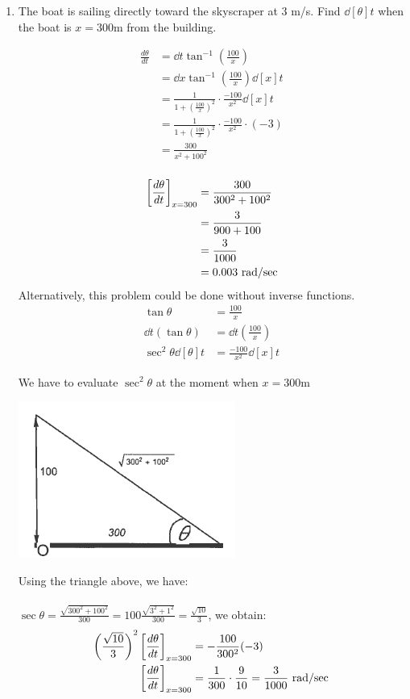 \documentclass[nooutcomes,handout]{ximera}
\begin{document}
\begin{problem}
\begin{enumerate}
	\item The boat is sailing directly toward the skyscraper at $3$ m/s.  Find $\dd[\theta]{t}$ when the boat is $x=300$m from the building.
	\begin{freeResponse}
	\begin{align*}
	\frac{d\theta}{dt}&=\dd{t}\tan^{-1}\left( \frac{100}{x} \right)\\
	&=\dd{x}\tan^{-1}\left( \frac{100}{x} \right)\dd[x]{t}\\
	&=\frac{1}{1+\left(\frac{100}{x}\right)^2} \cdot \frac{-100}{x^2} \dd[x]{t}\\
	&=\frac{1}{1+\left(\frac{100}{x}\right)^2} \cdot \frac{-100}{x^2} \cdot (-3)\\
	&=\frac{300}{x^2+100^2}\\\\
	\end{align*}
	\begin{align*}	
	\eval{\dd[\theta]{t}}_{x=300}&=\frac{300}{300^2+100^2}\\
	&=\frac{3}{900+100}\\
	&=\frac{3}{1000}\\
	&=0.003\ \text{rad/sec}
		\end{align*}
		Alternatively, this problem could be done without inverse functions.\\
	\begin{align*}
	\tan\theta&=\frac{100}{x}\\
	\dd{t}(\tan\theta)&=\dd{t} \left(\frac{100}{x}\right)\\
	\sec^2\theta \dd[\theta]{t}&=\frac{-100}{x^2}\dd[x]{t}
	\end{align*}
	
	We have to evaluate $\sec^2\theta$ at the moment when $x=300$m\\
	    \begin{image}
      \includegraphics[scale = 0.7]{figure7.png}
    \end{image}
	Using the triangle above, we have:\\\\
	$\sec\theta=\frac{\sqrt{300^2+100^2}}{300}=100\frac{\sqrt{3^2+1^2}}{300}=\frac{\sqrt{10}}{3}$, we obtain:\\
	\begin{align*}
	\left(\frac{\sqrt{10}}{3}\right)^2 \eval{\dd[\theta]{t}}_{x=300}&=-\frac{100}{300^2}(-3)\\
	\eval{\dd[\theta]{t}}_{x=300}&=\frac{1}{300} \cdot\frac{9}{10}=\frac{3}{1000}\  \text{rad/sec}
	\end{align*}

	\end{freeResponse}
\end{enumerate}
\end{problem}
\end{document}
